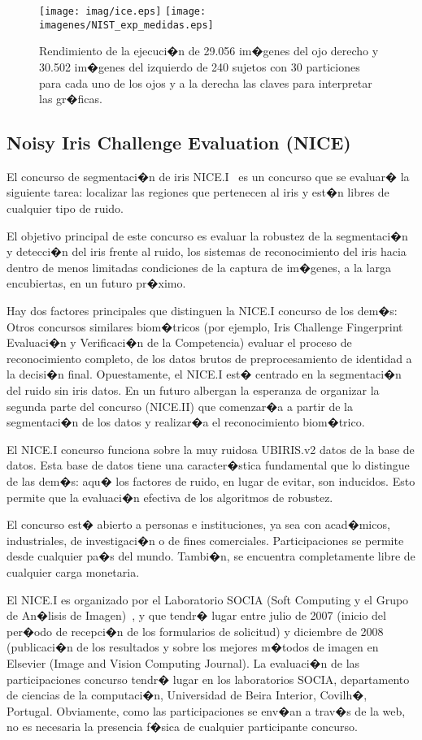 \begin{figure}[h!]
  \centerline{
    \mbox{\texttt{[image: imag/ice.eps]}}
    \mbox{\texttt{[image: imagenes/NIST\_exp\_medidas.eps]}}
  }
  \caption{Rendimiento de la ejecuci�n de 29.056 im�genes del ojo derecho y 30.502 im�genes del izquierdo de 240 sujetos con 30 particiones para cada uno de los ojos y a la derecha las claves para interpretar las gr�ficas.}
  \label{fig:grafica_ice2006}
\end{figure}

\subsection{Noisy Iris Challenge Evaluation (NICE)}
El concurso de segmentaci�n de iris NICE.I~\cite{web:NICE} es un concurso que se evaluar� la siguiente tarea: localizar las regiones que pertenecen al iris y est�n libres de cualquier tipo de ruido.

El objetivo principal de este concurso es evaluar la robustez de la segmentaci�n y detecci�n del iris frente al ruido, los sistemas de reconocimiento del iris hacia dentro de menos limitadas condiciones de la captura de im�genes, a la larga encubiertas, en un futuro pr�ximo.

Hay dos factores principales que distinguen la NICE.I concurso de los dem�s:
Otros concursos similares biom�tricos (por ejemplo, Iris Challenge Fingerprint Evaluaci�n y Verificaci�n de la Competencia) evaluar el proceso de reconocimiento completo, de los datos brutos de preprocesamiento de identidad a la decisi�n final. Opuestamente, el NICE.I est� centrado en la segmentaci�n del ruido sin iris datos. En un futuro albergan la esperanza de organizar la segunda parte del concurso (NICE.II) que comenzar�a a partir de la segmentaci�n de los datos y realizar�a el reconocimiento biom�trico.

El NICE.I concurso funciona sobre la muy ruidosa UBIRIS.v2 datos de la base de datos. Esta base de datos tiene una caracter�stica fundamental que lo distingue de las dem�s: aqu� los factores de ruido, en lugar de evitar, son inducidos. Esto permite que la evaluaci�n efectiva de los algoritmos de robustez.

El concurso est� abierto a personas e instituciones, ya sea con acad�micos, industriales, de investigaci�n o de fines comerciales. Participaciones se permite desde cualquier pa�s del mundo. Tambi�n, se encuentra completamente libre de cualquier carga monetaria.

El NICE.I es organizado por el Laboratorio SOCIA (Soft Computing y el Grupo de An�lisis de Imagen)~\cite{web:SociaLAB}, y que tendr� lugar entre julio de 2007 (inicio del per�odo de recepci�n de los formularios de solicitud) y diciembre de 2008 (publicaci�n de los resultados y sobre los mejores m�todos de imagen en Elsevier (Image and Vision Computing Journal). La evaluaci�n de las participaciones concurso tendr� lugar en los laboratorios SOCIA, departamento de ciencias de la computaci�n, Universidad de Beira Interior, Covilh�, Portugal. Obviamente, como las participaciones se env�an a trav�s de la web, no es necesaria la presencia f�sica de cualquier participante concurso.


\newpage \thispagestyle{empty} %